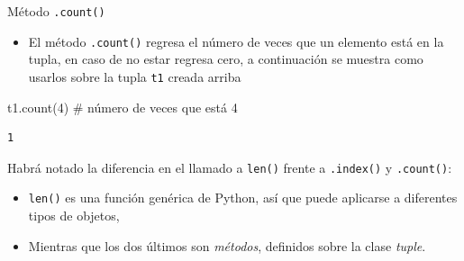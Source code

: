 \documentclass[
  ignorenonframetext,
  aspectratio=169,
  spanish,
]{beamer}
\newenvironment{Shaded}{\begin{snugshade}}{\end{snugshade}}
\newcommand{\CommentTok}[1]{\textcolor[rgb]{0.37,0.37,0.37}{#1}}
\newcommand{\DecValTok}[1]{\textcolor[rgb]{0.68,0.00,0.00}{#1}}
\newcommand{\NormalTok}[1]{\textcolor[rgb]{0.00,0.23,0.31}{#1}}
\providecommand{\tightlist}{%
  \setlength{\itemsep}{0pt}\setlength{\parskip}{0pt}}
\begin{document}
\begin{frame}[fragile]{Método \texttt{.count()}}
\label{muxe9todo-.count}
\begin{itemize}
\tightlist
\item
  El método \texttt{.count()} regresa el número de veces que un elemento
  está en la tupla, en caso de no estar regresa cero, a continuación se
  muestra como usarlos sobre la tupla \texttt{t1} creada arriba
\end{itemize}

\begin{Shaded}
\begin{Highlighting}[]
\NormalTok{t1.count(}\DecValTok{4}\NormalTok{) }\CommentTok{\# número de veces que está 4 }
\end{Highlighting}
\end{Shaded}

\begin{verbatim}
1
\end{verbatim}
\end{frame}

\begin{frame}[fragile]{}
\label{section}
\begin{tcolorbox}[enhanced jigsaw, colbacktitle=quarto-callout-important-color!10!white, colframe=quarto-callout-important-color-frame, arc=.35mm, opacityback=0, toptitle=1mm, left=2mm, breakable, title=\textcolor{quarto-callout-important-color}{\faExclamation}\hspace{0.5em}{Importante}, bottomtitle=1mm, titlerule=0mm, rightrule=.15mm, coltitle=black, bottomrule=.15mm, toprule=.15mm, colback=white, leftrule=.75mm, opacitybacktitle=0.6]

Habrá notado la diferencia en el llamado a \texttt{len()} frente a
\texttt{.index()} y \texttt{.count()}:

\begin{itemize}
\item
  \texttt{len()} es una función genérica de Python, así que puede
  aplicarse a diferentes tipos de objetos,
\item
  Mientras que los dos últimos son \emph{métodos}, definidos sobre la
  clase \emph{tuple}.
\end{itemize}

\end{tcolorbox}
\end{frame}
\end{document}
